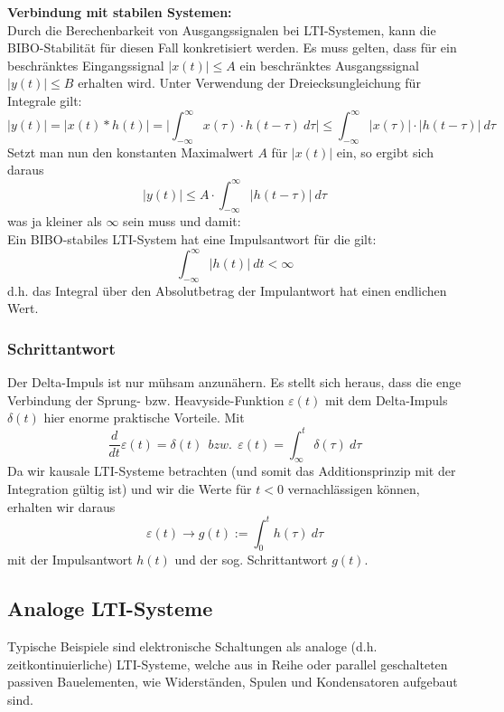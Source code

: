 \documentclass[12pt,a4paper]{scrartcl}
\begin{document}
    \noindent \textbf{Verbindung mit stabilen Systemen:} \\
    \noindent Durch die Berechenbarkeit von Ausgangssignalen bei LTI-Systemen, kann die BIBO-Stabilität für diesen Fall konkretisiert werden. 
    Es muss gelten, dass für ein beschränktes Eingangssignal $|x(t)| \leq A$ ein beschränktes Ausgangssignal $|y(t)| \leq B$ erhalten wird. 
    Unter Verwendung der Dreiecksungleichung für Integrale gilt:
    \begin{equation}\label{eq:29}|y(t)| = | x(t) * h(t)| = \bigg| \int_{-\infty}^{\infty}x(\tau)\cdot h(t- \tau)\ d \tau \bigg| \leq \int_{-\infty}^{\infty}|x(\tau)|\cdot |h(t- \tau)| \ d \tau \end{equation}
    Setzt man nun den konstanten Maximalwert $A$ für $|x(t)|$ ein, so ergibt sich daraus
    $$|y(t)| \leq A \cdot \int_{-\infty}^{\infty} |h(t-\tau)|\ d\tau$$
    was ja kleiner als $\infty$ sein muss und damit:\\

    Ein BIBO-stabiles LTI-System hat eine Impulsantwort für die gilt:
    \begin{equation}
      \label{eq:30}
      \int_{-\infty}^{\infty} |h(t)|\ dt < \infty
    \end{equation}
    \indent d.h. das Integral über den Absolutbetrag der Impulantwort hat einen endlichen Wert.

    \subsubsection{Schrittantwort}
    \label{sec:sub:sub:schrittantwort}

    \noindent    Der Delta-Impuls ist nur mühsam anzunähern. Es stellt sich heraus, dass die enge Verbindung der Sprung- bzw. Heavyside-Funktion $\varepsilon(t)$ mit dem Delta-Impuls $\delta(t)$ hier enorme praktische Vorteile.
    Mit
    $$ \frac{d}{dt}\varepsilon(t) = \delta (t)\ \ bzw.\ \ \varepsilon(t) = \int_{\infty}^{t} \delta(\tau)\ d\tau$$
    Da wir kausale LTI-Systeme betrachten (und somit das Additionsprinzip mit der Integration gültig ist) und wir die Werte für $t<0$ vernachlässigen können, erhalten wir daraus
    \begin{equation}\label{eq:31} \varepsilon(t) \to g(t) := \int_{0}^{t}h(\tau)\ d\tau\end{equation}
    mit der Impulsantwort $h(t)$ und der sog. Schrittantwort $g(t)$.

  \subsection{Analoge LTI-Systeme}
  \label{sec:sub:analoge-lti-systeme}
  Typische Beispiele sind elektronische Schaltungen als analoge (d.h. zeitkontinuierliche) LTI-Systeme, 
  welche aus in Reihe oder parallel geschalteten passiven Bauelementen, wie Widerständen, Spulen und Kondensatoren aufgebaut sind. \\
\end{document}
